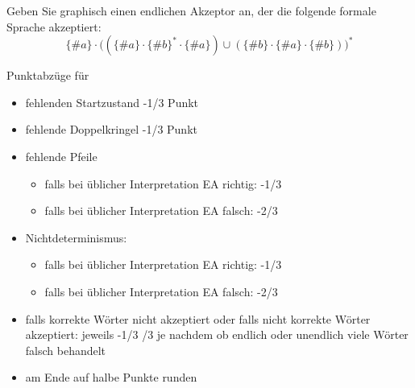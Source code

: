 \documentclass[12pt]{article}
\begin{document}

\begin{aufgabe}[3]
  Geben Sie graphisch einen endlichen Akzeptor an, der die folgende formale Sprache akzeptiert:
  \begin{equation*}
    \{\#a\} \cdot \big( (\{\#a\} \cdot \{\#b\}^* \cdot \{\#a\}) \cup (\{\#b\} \cdot \{\#a\} \cdot \{\#b\}) \big)^*
  \end{equation*}
\end{aufgabe}

\begin{loesung}
\end{loesung}
\begin{korrektur}
  Punktabzüge für
  \begin{itemize}
  \item fehlenden Startzustand -1/3 Punkt
  \item fehlende Doppelkringel -1/3 Punkt
  \item fehlende Pfeile
    \begin{itemize}
    \item falls bei üblicher Interpretation EA richtig: -1/3
    \item falls bei üblicher Interpretation EA falsch: -2/3
    \end{itemize}
  \item Nichtdeterminismus: 
    \begin{itemize}
    \item falls bei üblicher Interpretation EA richtig: -1/3
    \item falls bei üblicher Interpretation EA falsch: -2/3
    \end{itemize}
  \item falls korrekte Wörter nicht akzeptiert oder falls nicht
    korrekte Wörter akzeptiert: jeweils -1/3 /3 je nachdem ob
    endlich oder unendlich viele Wörter falsch behandelt
  \item am Ende auf halbe Punkte runden
  \end{itemize}
\end{korrektur}

\end{document}
